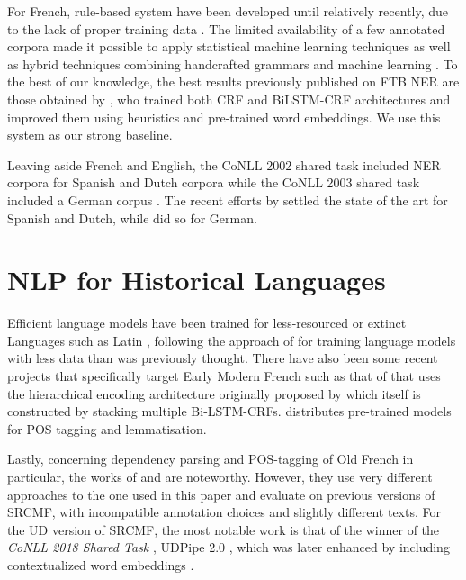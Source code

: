 For French, rule-based system have been developed until relatively recently, due to the lack of proper training data \citep{sekine-nobata-2004-definition,rosset-etal-2005-interaction,stern-sagot-2010-resources,nouvel-etal-2014-pattern}. The limited availability of a few annotated corpora made it possible to apply statistical machine learning techniques \citep{bechet-charton-2010-unsupervised,dupont-tellier-2014-named,dupont-2017-exploration} as well as hybrid techniques combining handcrafted grammars and machine learning \citep{bechet-etal-2011-cooperation}. To the best of our knowledge, the best results previously published on FTB NER are those obtained by \citet{dupont-2017-exploration}, who trained both CRF and BiLSTM-CRF architectures and improved them using heuristics and pre-trained word embeddings. We use this system as our strong baseline.

Leaving aside French and English, the CoNLL 2002 shared task included NER corpora for Spanish and Dutch corpora \citep{tjong-kim-sang-2002-introduction} while the CoNLL 2003 shared task included a German corpus \citep{tjong-kim-sang-de-meulder-2003-introduction}. The recent efforts by \citet{strakova-etal-2019-neural} settled the state of the art for Spanish and Dutch, while \citet{akbik-etal-2018-contextual} did so for German.


\section{NLP for Historical Languages}

Efficient language models have been trained for less-resourced or extinct Languages such as Latin \citep{bamman-burns-2020-latin}, following the approach of \citet{martin-etal-2020-camembert} for training language models with less data than was previously thought. There have also been some recent projects that specifically target Early Modern French such as that of \pieextended \citep{clerice-2020-pie} that uses the hierarchical encoding architecture originally proposed by \citet{manjavacas-etal-2019-improving} which itself is constructed by stacking multiple Bi-LSTM-CRFs. \citet{clerice-2020-pie} distributes pre-trained models for POS tagging and lemmatisation.

Lastly, concerning dependency parsing and POS-tagging of Old French in particular, the works of \citet{guibon-etal-2014-parsing} and \citet{stein-2014-parsing, stein-2016-old} are noteworthy. However, they use very different approaches to the one used in this paper and evaluate on previous versions of SRCMF, with incompatible annotation choices and slightly different texts. For the UD version of SRCMF, the most notable work is that of the winner of the \emph{CoNLL 2018 Shared Task} \citep{zeman-etal-2018-conll}, UDPipe 2.0 \citep{straka-2018-udpipe}, which was later enhanced by including contextualized word embeddings \citep{straka-strakova-2019-evaluating}.
